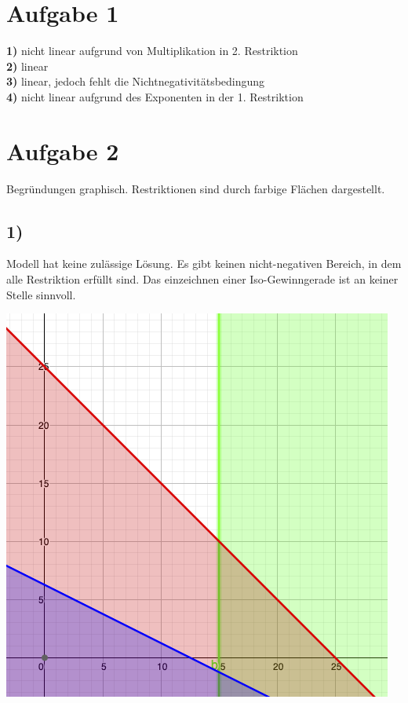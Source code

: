 \documentclass[a4paper,11pt]{article}
\begin{document}
\raggedright %
\setlength{\mathindent}{0cm} %

\section*{Aufgabe 1}

\textbf{1)} nicht linear aufgrund von Multiplikation in 2. Restriktion \\
\textbf{2)} linear \\
\textbf{3)} linear, jedoch fehlt die Nichtnegativitätsbedingung \\
\textbf{4)} nicht linear aufgrund des Exponenten in der 1. Restriktion \\

\section*{Aufgabe 2}
Begründungen graphisch. Restriktionen sind durch farbige Flächen dargestellt. \\

\subsection*{1)}
Modell hat keine zulässige Lösung. Es gibt keinen nicht-negativen Bereich, in dem alle Restriktion erfüllt sind. Das einzeichnen einer Iso-Gewinngerade ist an keiner Stelle sinnvoll. \newline

\begin{centering}
	\includegraphics[width=.7\linewidth]{src/a2_1.png}
\end{centering}
\end{document}
